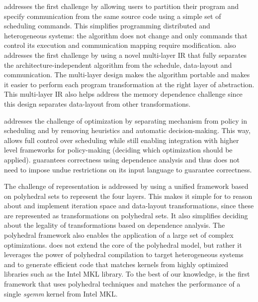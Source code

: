 \framework{} addresses the first challenge by allowing users to partition their program and specify communication from the same source code using a simple set of scheduling commands. This simplifies programming distributed and heterogeneous systems: the algorithm does not change and only commands that control its execution and communication mapping require modification.
\framework{} also addresses the first challenge by using a novel multi-layer IR that fully separates the architecture-independent algorithm from the schedule, data-layout and communication.
The multi-layer design makes the algorithm portable and makes it easier to perform each program transformation at the right layer of abstraction.
This multi-layer IR also helps \framework{} address the memory dependence challenge since this design separates data-layout from other transformations.

\framework{} addresses the challenge of optimization by separating mechanism from policy in scheduling and by removing heuristics and automatic decision-making.  This way, \framework{} allows full control over scheduling while still enabling integration with higher level frameworks for policy-making (deciding which optimization should be applied).  \framework{} guarantees correctness using dependence analysis and thus  does not need to impose undue restrictions on its input language to guarantee correctness.

The challenge of representation is addressed by using a unified framework based on polyhedral sets to represent the four layers.  This makes it simple for \framework{} to reason about and implement iteration space and data-layout transformations, since these are represented as transformations on polyhedral sets.  It also simplifies deciding about the legality of transformations based on dependence analysis.
The polyhedral framework also enables the application of a large set of complex optimizations. \framework{} does not extend the core of the polyhedral model, but rather it leverages the power of polyhedral compilation to target heterogeneous systems and to generate efficient code that matches kernels from highly optimized libraries such as the Intel MKL library. To the best of our knowledge, \framework{} is the first framework that uses polyhedral techniques and matches the performance of a single \emph{sgemm} kernel from Intel MKL.

